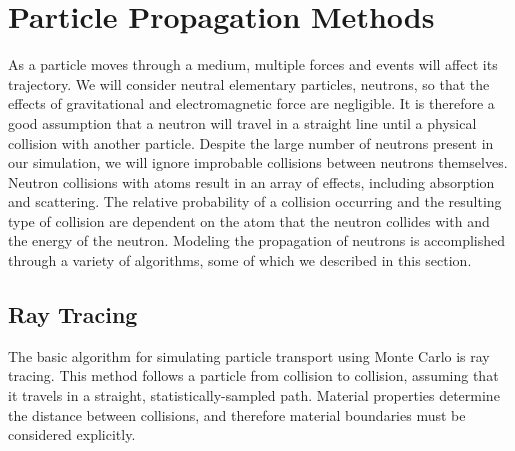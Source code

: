 \section{Particle Propagation Methods}
\label{sec:propagation}

As a particle moves through a medium, multiple forces and events will
affect its trajectory. We will consider neutral elementary particles,
neutrons, so that the effects of gravitational and electromagnetic
force are negligible. It is therefore a good assumption that a neutron
will travel in a straight line until a physical collision with another
particle. Despite the large number of neutrons present in our
simulation, we will ignore improbable collisions between neutrons
themselves. Neutron collisions with atoms result in an array of
effects, including absorption and scattering. The relative probability
of a collision occurring and the resulting type of collision are
dependent on the atom that the neutron collides with and the energy of the
neutron. Modeling the propagation of neutrons is accomplished through
a variety of algorithms, some of which we described in this section.

\subsection{Ray Tracing}
\label{sec:ray_tracing}

The basic algorithm for simulating particle transport using Monte Carlo is
ray tracing. This method follows a particle from collision to
collision, assuming that it travels in a straight, statistically-sampled 
path. Material properties determine the distance between
collisions, and therefore material boundaries must be considered explicitly.

